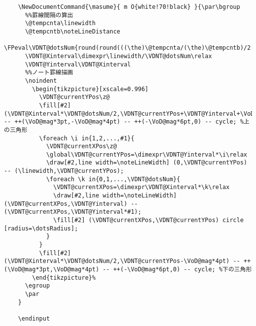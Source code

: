 \documentclass[a4paper,12pt]{article}
\begin{document}
\begin{lstlisting}
    \NewDocumentCommand{\masume}{ m O{white!70!black} }{\par\bgroup
      %%罫線間隔の算出
      \@tempcnta\linewidth
      \@tempcntb\noteLineDistance
      \FPeval\VDNT@dotsNum{round(round(((\the)\@tempcnta/(\the)\@tempcntb)/2:0)*2:0)}%
      \VDNT@Xinterval\dimexpr\linewidth/\VDNT@dotsNum\relax
      \VDNT@Yinterval\VDNT@Xinterval
      %%ノート罫線描画
      \noindent
        \begin{tikzpicture}[xscale=0.996]
          \VDNT@currentYPos\z@
          \fill[#2] (\VDNT@Xinterval*\VDNT@dotsNum/2,\VDNT@currentYPos+\VDNT@Yinterval+\VoD@mag*4pt) -- ++(\VoD@mag*3pt,-\VoD@mag*4pt) -- ++(-\VoD@mag*6pt,0) -- cycle; %上の三角形
          \foreach \i in{1,2,...,#1}{ 
            \VDNT@currentXPos\z@
            \global\VDNT@currentYPos=\dimexpr\VDNT@Yinterval*\i\relax
            \draw[#2,line width=\noteLineWidth] (0,\VDNT@currentYPos) -- (\linewidth,\VDNT@currentYPos);
            \foreach \k in{0,1,...,\VDNT@dotsNum}{
              \VDNT@currentXPos=\dimexpr\VDNT@Xinterval*\k\relax
              \draw[#2,line width=\noteLineWidth] (\VDNT@currentXPos,\VDNT@Yinterval) -- (\VDNT@currentXPos,\VDNT@Yinterval*#1);
              \fill[#2] (\VDNT@currentXPos,\VDNT@currentYPos) circle [radius=\dotsRadius];
            }
          }
          \fill[#2] (\VDNT@Xinterval*\VDNT@dotsNum/2,\VDNT@currentYPos-\VoD@mag*4pt) -- ++(\VoD@mag*3pt,\VoD@mag*4pt) -- ++(-\VoD@mag*6pt,0) -- cycle; %下の三角形
        \end{tikzpicture}%
      \egroup
      \par
    }

    \endinput
  \end{lstlisting}
\end{document}
